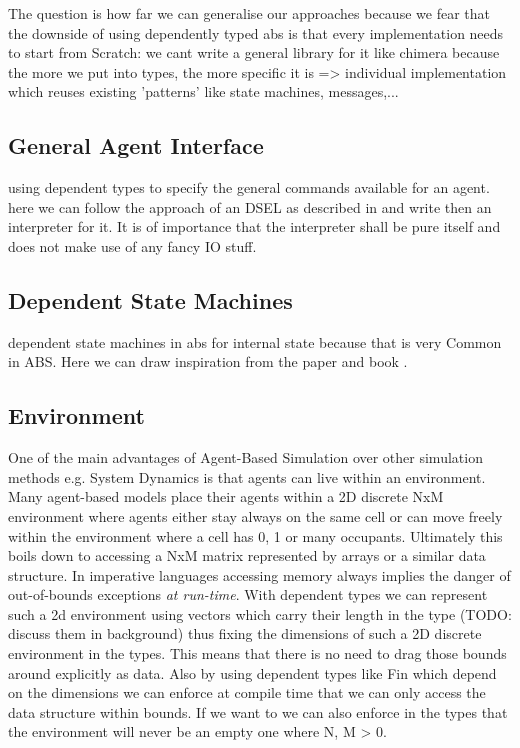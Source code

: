 The question is how far we can generalise our approaches because we fear that the downside of using dependently typed abs is that every implementation needs to start from Scratch: we cant write a general library for it like chimera because the more we put into types, the more specific it is => individual implementation which reuses existing 'patterns' like state machines, messages,...

\subsection{General Agent Interface}
using dependent types to specify the general commands available for an agent. here we can follow the approach of an DSEL as described in \cite{brady_correct-by-construction_2010} and write then an interpreter for it. It is of importance that the interpreter shall be pure itself and does not make use of any fancy IO stuff.

\subsection{Dependent State Machines}
dependent state machines in abs for internal state because that is very Common in ABS. Here we can draw inspiration from the paper \cite{brady_state_2016} and book \cite{brady_type-driven_2017}.

\subsection{Environment}
One of the main advantages of Agent-Based Simulation over other simulation methods e.g. System Dynamics is that agents can live within an environment. Many agent-based models place their agents within a 2D discrete NxM environment where agents either stay always on the same cell or can move freely within the environment where a cell has 0, 1 or many occupants. Ultimately this boils down to accessing a NxM matrix represented by arrays or a similar data structure. In imperative languages accessing memory always implies the danger of out-of-bounds exceptions \textit{at run-time}. With dependent types we can represent such a 2d environment using vectors which carry their length in the type (TODO: discuss them in background) thus fixing the dimensions of such a 2D discrete environment in the types. This means that there is no need to drag those bounds around explicitly as data. Also by using dependent types like Fin which depend on the dimensions we can enforce at compile time that we can only access the data structure within bounds. If we want to we can also enforce in the types that the environment will never be an empty one where N, M > 0.

